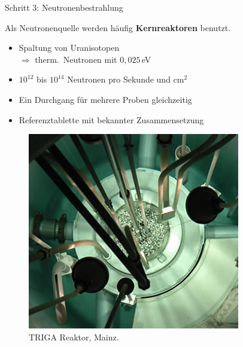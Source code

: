 \documentclass[xcolor=dvipsnames, aspectratio=169]{beamer}
\begin{document}
\begin{frame}{Schritt 3: Neutronenbestrahlung}
\begin{minipage}{0.52\textwidth}\flushleft
Als Neutronenquelle werden häufig \textbf{Kernreaktoren} benutzt.\smallskip

\begin{itemize}
\item Spaltung von Uranisotopen\\$\Rightarrow$ therm.\ Neutronen mit $0,025$\,eV
\item $10^{12}$ bis $10^{14}$ Neutronen pro Sekunde und cm$^2$
\item Ein Durchgang für mehrere Proben gleichzeitig
\item \alert{Referenztablette} mit bekannter Zusammensetzung
\end{itemize}
\end{minipage}\hfill
\begin{minipage}{0.44\textwidth}
\begin{figure}
\includegraphics[width=\textwidth]{img/reactor-mainz.png}
\caption{TRIGA Reaktor, Mainz.}
\end{figure}
\end{minipage}
\end{frame}
\end{document}
